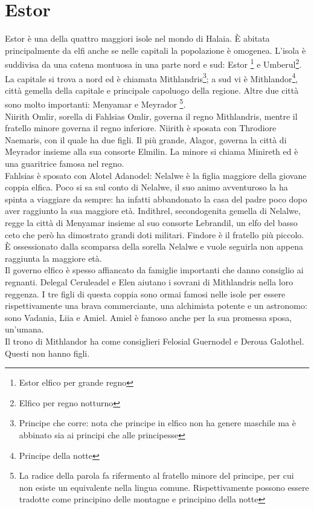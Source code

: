 \section{Estor}
Estor \`e una della quattro maggiori isole nel mondo di Halaia. \`E abitata
principalmente da elfi anche se nelle capitali la popolazione \`e omogenea.
L'isola \`e suddivisa da una catena montuosa in una parte nord e sud: Estor
\footnote{Estor elfico per grande regno}
e Umberul\footnote{Elfico per regno notturno}. La capitale si trova a nord
ed \`e chiamata Mithlandris\footnote{Principe che corre: nota che principe in elfico
  non ha genere maschile ma \`e abbinato sia ai principi che alle principesse}; a sud
vi \`e Mithlandor\footnote{Principe della notte}, citt\`a gemella
della capitale e principale capoluogo della regione.
Altre due citt\`a sono molto importanti: Menyamar e Meyrador
\footnote{La radice della parola fa rifermento al fratello minore del
  principe, per cui non esiste un equivalente nella lingua comune.
  Rispettivamente possono essere tradotte come principino delle montagne
  e principino della notte}.\\
Niirith Omlir, sorella di Fahlsias Omlir, governa il regno Mithlandris, mentre
il fratello minore governa il regno inferiore.
Niirith \`e sposata con Throdiore Naemaris, con il quale ha due figli. Il pi\`u
grande, Alagor, governa la citt\`a di Meyrador insieme alla sua consorte Elmilin.
La minore si chiama Minireth ed \`e una guaritrice famosa nel regno.\\
Fahlsias \`e sposato con Alotel Adanodel: Nelalwe \`e la figlia maggiore della
giovane coppia elfica. Poco si sa sul conto di Nelalwe, il suo animo avventuroso la
ha spinta a viaggiare da sempre: ha infatti abbandonato la casa del padre poco
dopo aver raggiunto la sua maggiore et\`a.
Indithrel, secondogenita gemella di Nelalwe, regge la citt\`a di Menyamar insieme
al suo consorte Lebrandil, un elfo del basso ceto che per\`o ha dimostrato grandi
doti militari.
Findore \`e il fratello pi\`u piccolo. \`E ossessionato dalla scomparsa della sorella
Nelalwe e vuole seguirla non appena raggiunta la maggiore et\`a.\\
Il governo elfico \`e spesso affiancato da famiglie importanti che danno consiglio
ai regnanti. Delegal Ceruleadel e Elen aiutano i sovrani di Mithlandris nella loro
reggenza. I tre figli di questa coppia sono ormai famosi nelle isole per essere
rispettivamente una brava commerciante, una alchimista potente e un astronomo:
sono Vadania, Liia e Amiel. Amiel \`e famoso anche per la sua promessa sposa, un'umana.\\
Il trono di Mithlandor ha come consiglieri Felosial Guernodel e Deroua Galothel.
Questi non hanno figli.













